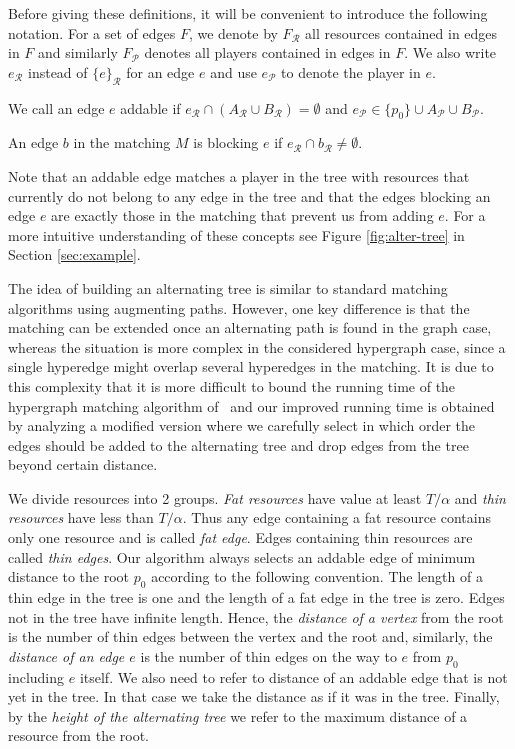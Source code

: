 \documentclass{llncs}
\newcommand{\res}{\ensuremath{\mathcal{R}}\xspace}
\newcommand{\players}{\ensuremath{\mathcal{P}}\xspace}
\begin{document}
Before giving these definitions, it will be convenient to introduce
the following notation. For a set of edges $F$, we denote by $F_\res$
all resources contained in edges in $F$ and similarly $F_\players$
denotes all players contained in edges in $F$. We also write $e_\res$
instead of $\{e\}_\res$ for an edge $e$ and use $e_\players$ to denote
the player in $e$.

\begin{definition}
We call an edge $e$ addable if $e_\res\cap (A_\res\cup B_\res) = \emptyset$ and
$e_\players\in \{p_0\}\cup A_\players\cup B_\players$.
\end{definition}
\begin{definition}
An edge $b$ in the matching $M$ is blocking $e$ if
$e_\res\cap b_\res \not= \emptyset$.
\end{definition}
Note that an addable edge matches a player in the tree with resources
that currently do not belong to any edge in the tree and that the
edges blocking an edge $e$ are exactly those in the matching that
prevent us from adding $e$. For a more intuitive understanding of
these concepts see Figure \ref{fig:alter-tree} in Section \ref{sec:example}.

The idea of building an alternating tree is similar to standard matching
algorithms using augmenting paths. However, one key difference is that the matching can be
extended once an alternating path is found in the graph case, whereas
the situation is more complex in the considered hypergraph case, since
a single hyperedge might overlap several hyperedges in the matching. It is due
to this complexity that it is more difficult to bound the running time
of the hypergraph matching algorithm of~\cite{AFS08} and our improved
running time is obtained by analyzing a modified version where we
carefully select in which order the edges should be added to the
alternating tree and drop edges from the tree beyond certain distance.

We divide resources into 2 groups. \emph{Fat resources} have value at least
$T/\alpha$ and \emph{thin resources} have less than $T/\alpha$. Thus any edge
containing a fat resource contains only one resource and is called \emph{fat
edge}. Edges containing thin resources are called \emph{thin edges}. Our
algorithm always selects an addable edge of minimum distance to the root $p_0$
according to the following convention. The length of a thin edge in the tree is
one and the length of a fat edge in the tree is zero. Edges not in the tree have
infinite length. Hence, the \emph{distance of a vertex} from the root is the
number of thin edges between the vertex and the root and, similarly, the
\emph{distance of an edge $e$} is the number of thin edges on the way to $e$
from $p_0$ including $e$ itself. We also need to refer to distance of an
addable edge that is not yet in the tree. In that case we take the distance as
if it was in the tree. Finally, by the \emph{height of the alternating tree} we
refer to the maximum distance of a resource from the root.
\end{document}
